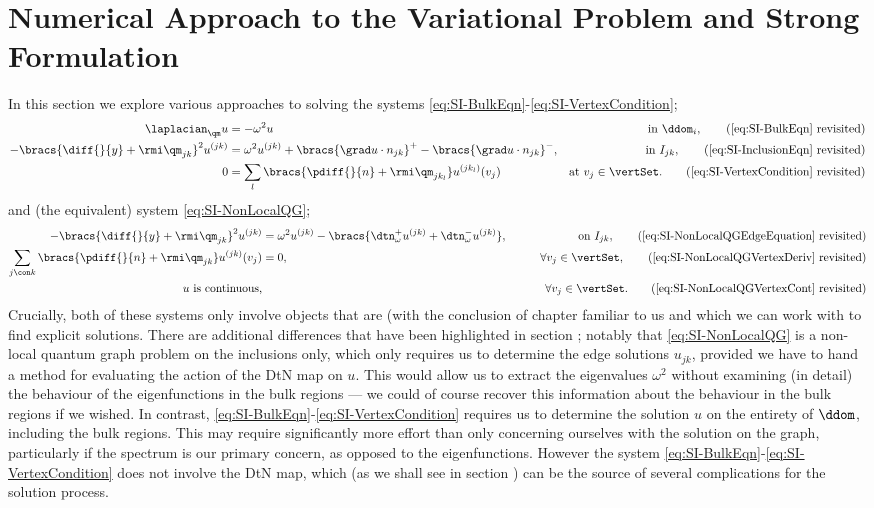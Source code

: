 \section{Numerical Approach to the Variational Problem and Strong Formulation}



In this section we explore various approaches to solving the systems \eqref{eq:SI-BulkEqn}-\eqref{eq:SI-VertexCondition};
\begin{align*}
	\laplacian_\qm u 
	&= -\omega^2 u 
	&\text{in } \ddom_i, 
	\tag{\ref{eq:SI-BulkEqn} revisited} \\
	- \bracs{\diff{}{y} + \rmi\qm_{jk}}^2u^{(jk)} 
	&= \omega^2 u^{(jk)} + \bracs{\grad u\cdot n_{jk}}^+ - \bracs{\grad u\cdot n_{jk}}^-,
	&\text{in } I_{jk}, 
	\tag{\ref{eq:SI-InclusionEqn} revisited} \\
	0 
	&= \sum_l \bracs{\pdiff{}{n}+\rmi\qm_{jk_l}} u^{(jk_l)}(v_j) 
	&\text{at } v_j\in\vertSet. 
	\tag{\ref{eq:SI-VertexCondition} revisited}
\end{align*}
and (the equivalent) system \eqref{eq:SI-NonLocalQG};
\begin{align*}
	- \bracs{\diff{}{y} + \rmi\qm_{jk}}^2u^{(jk)} 
	&= \omega^2 u^{(jk)} - \bracs{ \dtn^+_\omega u^{(jk)} + \dtn^-_\omega u^{(jk)}},
	&\qquad\text{on } I_{jk}, 
	\tag{\ref{eq:SI-NonLocalQGEdgeEquation} revisited}  \\
	\sum_{j\con k} \bracs{\pdiff{}{n}+\rmi\qm_{jk}} u^{(jk)}(v_j) 
	&= 0,
	&\qquad\forall v_j\in\vertSet, \tag{\ref{eq:SI-NonLocalQGVertexDeriv} revisited} \\
	u \text{ is continuous,} 
	& 
	&\qquad\forall v_j\in\vertSet. \tag{\ref{eq:SI-NonLocalQGVertexCont} revisited}
\end{align*}
Crucially, both of these systems only involve objects that are (with the conclusion of chapter  familiar to us and which we can work with to find explicit solutions.
There are additional differences that have been highlighted in section ; notably that \eqref{eq:SI-NonLocalQG} is a non-local quantum graph problem on the inclusions only, which only requires us to determine the edge solutions $u_{jk}$, provided we have to hand a method for evaluating the action of the DtN map on $u$.
This would allow us to extract the eigenvalues $\omega^2$ without examining (in detail) the behaviour of the eigenfunctions in the bulk regions --- we could of course recover this information about the behaviour in the bulk regions if we wished.
In contrast, \eqref{eq:SI-BulkEqn}-\eqref{eq:SI-VertexCondition} requires us to determine the solution $u$ on the entirety of $\ddom$, including the bulk regions.
This may require significantly more effort than only concerning ourselves with the solution on the graph, particularly if the spectrum is our primary concern, as opposed to the eigenfunctions.
However the system \eqref{eq:SI-BulkEqn}-\eqref{eq:SI-VertexCondition} does not involve the DtN map, which (as we shall see in section ) can be the source of several complications for the solution process.

